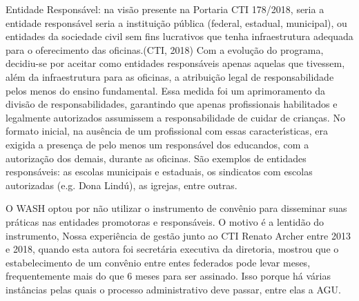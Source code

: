 \documentclass[
12pt,		%
openright,	%
twoside,  %
a4paper,			%
chapter=TITLE,		%
english,			%
french,				%
spanish,			%
brazil				%
]{USPSC-classe/USPSC}
\begin{document}
\begin{alineas}
\item Entidade Respons\'avel: na vis\~ao presente na Portaria CTI 178/2018, seria a entidade respons\'avel seria a \textquotedbl institui\c{c}\~ao p\'ublica (federal, estadual, municipal), ou entidades da sociedade civil sem fins lucrativos que tenha infraestrutura adequada para o oferecimento das oficinas.\textquotedbl   (CTI, 2018)  Com a evolu\c{c}\~ao do programa, decidiu-se por aceitar como entidades respons\'aveis apenas aquelas que tivessem, al\'em da infraestrutura para as oficinas, a atribui\c{c}\~ao legal de responsabilidade pelos menos do ensino fundamental. Essa medida foi um aprimoramento da divis\~ao de responsabilidades, garantindo que apenas profissionais habilitados e legalmente autorizados assumissem a responsabilidade de \textquotedbl cuidar de crian\c{c}as\textquotedbl . No formato inicial, na aus\^encia de um profissional com essas caracter\'{\i}sticas, era exigida a presen\c{c}a de pelo menos um respons\'avel dos educandos, com a autoriza\c{c}\~ao dos demais, durante as oficinas. S\~ao exemplos de entidades respons\'aveis: as escolas municipais e estaduais, os sindicatos com escolas autorizadas (e.g. Dona Lind\'u), as igrejas, entre outras.
\end{alineas}

O WASH optou por n\~ao utilizar o instrumento de conv\^enio para disseminar suas pr\'aticas nas entidades promotoras e respons\'aveis. O motivo \'e a lentid\~ao do instrumento, Nossa experi\^encia de gest\~ao junto ao CTI Renato Archer entre 2013 e 2018, quando esta autora foi secret\'aria executiva da  diretoria, mostrou que o estabelecimento de um conv\^enio entre entes federados pode levar meses, frequentemente mais do que 6 meses para ser assinado. Isso porque h\'a v\'arias inst\^ancias pelas quais o processo administrativo deve passar, entre elas a AGU.
\end{document}
